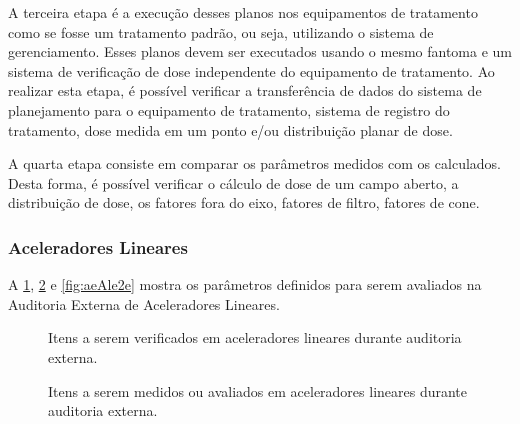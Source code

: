 \documentclass[11pt,a4paper]{article}
\begin{document}
	A terceira etapa é a execução desses planos nos equipamentos de tratamento como se fosse um tratamento padrão, ou seja, utilizando o sistema de gerenciamento. Esses planos devem ser executados usando o mesmo fantoma e um sistema de verificação de dose independente do equipamento de tratamento. Ao realizar esta etapa, é possível verificar a transferência de dados do sistema de planejamento para o equipamento de tratamento, sistema de registro do tratamento, dose medida em um ponto e/ou distribuição planar de dose. 

	A quarta etapa consiste em comparar os parâmetros medidos com os calculados. Desta forma, é possível verificar o cálculo de dose de um campo aberto, a distribuição de dose, os fatores fora do eixo, fatores de filtro, fatores de cone.


\subsubsection*{Aceleradores Lineares}

	A \ref{fig:aeAlVerif}, \ref{fig:aeAlMed} e \ref{fig:aeAle2e} mostra os parâmetros definidos para serem avaliados na Auditoria Externa de Aceleradores Lineares.

	\begin{figure}[h]
		\centering
		\caption{Itens a serem verificados em aceleradores lineares durante auditoria externa.}
		\label{fig:aeAlVerif}
	\end{figure}

	\begin{figure}[h]
		\centering
		\caption{Itens a serem medidos ou avaliados em aceleradores lineares durante auditoria externa.}
		\label{fig:aeAlMed}
	\end{figure}
\end{document}
